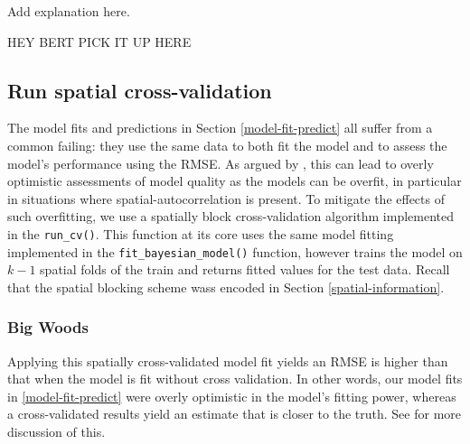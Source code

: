 \documentclass[12pt]{article}
\newenvironment{Shaded}{\begin{snugshade}}{\end{snugshade}}
\newcommand{\DataTypeTok}[1]{\textcolor[rgb]{0.13,0.29,0.53}{#1}}
\newcommand{\KeywordTok}[1]{\textcolor[rgb]{0.13,0.29,0.53}{\textbf{#1}}}
\newcommand{\NormalTok}[1]{#1}
\newcommand{\OperatorTok}[1]{\textcolor[rgb]{0.81,0.36,0.00}{\textbf{#1}}}
\newcommand{\StringTok}[1]{\textcolor[rgb]{0.31,0.60,0.02}{#1}}
\begin{document}
Add explanation here.

HEY BERT PICK IT UP HERE

\hypertarget{spatial-cross-validation}{%
\subsection{Run spatial
cross-validation}\label{spatial-cross-validation}}

The model fits and predictions in Section \ref{model-fit-predict} all
suffer from a common failing: they use the same data to both fit the
model and to assess the model's performance using the RMSE. As argued by
\citet{roberts_cross-validation_2017}, this can lead to overly
optimistic assessments of model quality as the models can be overfit, in
particular in situations where spatial-autocorrelation is present. To
mitigate the effects of such overfitting, we use a spatially block
cross-validation algorithm implemented in the \texttt{run\_cv()}. This
function at its core uses the same model fitting implemented in the
\texttt{fit\_bayesian\_model()} function, however trains the model on
\(k-1\) spatial folds of the train and returns fitted values for the
test data. Recall that the spatial blocking scheme wass encoded in
Section \ref{spatial-information}.

\hypertarget{big-woods-2}{%
\subsubsection{Big Woods}\label{big-woods-2}}

Applying this spatially cross-validated model fit yields an RMSE is
higher than that when the model is fit without cross validation. In
other words, our model fits in \ref{model-fit-predict} were overly
optimistic in the model's fitting power, whereas a cross-validated
results yield an estimate that is closer to the truth. See
\citet{allen_permutation_2020} for more discussion of this.

\begin{Shaded}
\end{Shaded}
\end{document}

